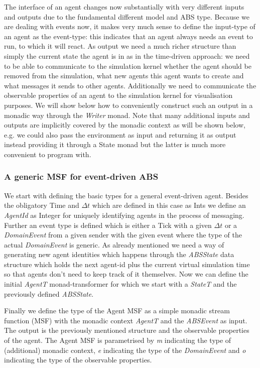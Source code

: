 The interface of an agent changes now substantially with very different inputs and outputs due to the fundamental different model and ABS type. Because we are dealing with events now, it makes very much sense to define the input-type of an agent as the event-type: this indicates that an agent always needs an event to run, to which it will react. As output we need a much richer structure than simply the current state the agent is in as in the time-driven approach: we need to be able to communicate to the simulation kernel whether the agent should be removed from the simulation, what new agents this agent wants to create and what messages it sends to other agents. Additionally we need to communicate the observable properties of an agent to the simulation kernel for visualisation purposes. We will show below how to conveniently construct such an output in a monadic way through the \textit{Writer} monad. Note that many additional inputs and outputs are implicitly covered by the monadic context as will be shown below, e.g. we could also pass the environment as input and returning it as output instead providing it through a State monad but the latter is much more convenient to program with.

\subsubsection{A generic MSF for event-driven ABS}
We start with defining the basic types for a general event-driven agent. Besides the obligatory Time and $\Delta t$ which are defined in this case as Ints we define an \textit{AgentId} as Integer for uniquely identifying agents in the process of messaging. Further an event type is defined which is either a Tick with a given $\Delta t$ or a \textit{DomainEvent} from a given sender with the given event where the type of the actual \textit{DomainEvent} is generic. As already mentioned we need a way of generating new agent identities which happens through the \textit{ABSState} data structure which holds the next agent-id plus the current virtual simulation time so that agents don't need to keep track of it themselves. Now we can define the initial \textit{AgentT} monad-transformer for which we start with a \textit{StateT} and the previously defined \textit{ABSState}. 

Finally we define the type of the Agent MSF as a simple monadic stream function (MSF) with the monadic context \textit{AgentT} and the \textit{ABSEvent} as input. The output is the previously mentioned structure and the observable properties of the agent. The Agent MSF is parametrised by \textit{m} indicating the type of (additional) monadic context, \textit{e} indicating the type of the \textit{DomainEvent} and \textit{o} indicating the type of the observable properties.

